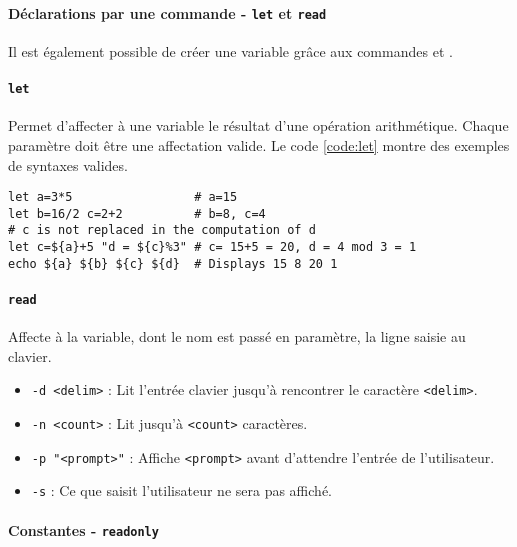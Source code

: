 \newpage

\paragraph{Déclarations par une commande - \texttt{let} et \texttt{read}}

Il est également possible de créer une variable grâce aux commandes  et .
\paragraph{\texttt{let}} 
Permet d'affecter à une variable le résultat d'une opération arithmétique.
Chaque paramètre doit être une affectation valide. Le code \ref{code:let} montre des exemples de syntaxes valides.
\begin{code}
    \begin{verbatim}
let a=3*5                 # a=15
let b=16/2 c=2+2          # b=8, c=4
# c is not replaced in the computation of d
let c=${a}+5 "d = ${c}%3" # c= 15+5 = 20, d = 4 mod 3 = 1
echo ${a} ${b} ${c} ${d}  # Displays 15 8 20 1
    \end{verbatim}
    
    \vspace{-0.5cm}
    \label{code:let}
\end{code}

\paragraph{\texttt{read}} 
Affecte à la variable, dont le nom est passé en paramètre, la ligne saisie au clavier.
\begin{itemize}
    \item \texttt{-d <delim>} : Lit l'entrée clavier jusqu'à rencontrer le caractère \texttt{<delim>}.
    \item \texttt{-n <count>} : Lit jusqu'à \texttt{<count>} caractères.
    \item \texttt{-p "<prompt>"} : Affiche \texttt{<prompt>} avant d'attendre l'entrée de l'utilisateur.
    \item \texttt{-s} : Ce que saisit l'utilisateur ne sera pas affiché.
\end{itemize}

\paragraph{Constantes - \texttt{readonly}} \label{sec:readonly} 

